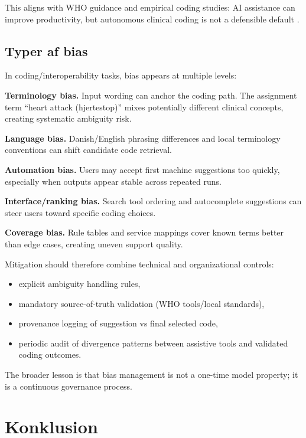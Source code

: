 This aligns with WHO guidance and empirical coding studies: AI assistance can improve productivity, but autonomous clinical coding is not a defensible default \parencite{who2023safeethicalai,who2021ethicsai,teixeira2024chatgpticd10,abdelgadir2024nephrologychatgpt,ahima2023chatgptroles}.

\subsection{Typer af bias}
\label{subsec:kodning_bias}

In coding/interoperability tasks, bias appears at multiple levels:

\textbf{Terminology bias.} Input wording can anchor the coding path. The assignment term ``heart attack (hjertestop)'' mixes potentially different clinical concepts, creating systematic ambiguity risk.

\textbf{Language bias.} Danish/English phrasing differences and local terminology conventions can shift candidate code retrieval.

\textbf{Automation bias.} Users may accept first machine suggestions too quickly, especially when outputs appear stable across repeated runs.

\textbf{Interface/ranking bias.} Search tool ordering and autocomplete suggestions can steer users toward specific coding choices.

\textbf{Coverage bias.} Rule tables and service mappings cover known terms better than edge cases, creating uneven support quality.

Mitigation should therefore combine technical and organizational controls:
\begin{itemize}
    \item explicit ambiguity handling rules,
    \item mandatory source-of-truth validation (WHO tools/local standards),
    \item provenance logging of suggestion vs final selected code,
    \item periodic audit of divergence patterns between assistive tools and validated coding outcomes.
\end{itemize}

The broader lesson is that bias management is not a one-time model property; it is a continuous governance process.

\clearpage

\section{Konklusion}
\label{sec:konklusion}

